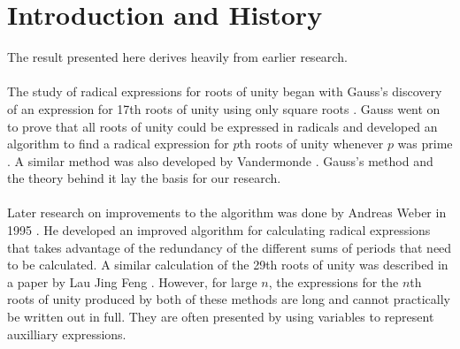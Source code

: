 \documentclass{article}
\begin{document}
\section{Introduction and History}
    The result presented here derives heavily from earlier research.\\
    \\
    The study of radical expressions for roots of unity began with Gauss's discovery of an expression for 17th roots of unity using only square roots \cite{17gon}. Gauss went on to prove that all roots of unity could be expressed in radicals and developed an algorithm to find a radical expression for $ p $th roots of unity whenever $ p $ was prime \cite{rootsunity}. A similar method was also developed by Vandermonde \cite{rootsunity-misc}. Gauss's method and the theory behind it lay the basis for our research.\\
    \\
    Later research on improvements to the algorithm was done by Andreas Weber in 1995 \cite{weber}. He developed an improved algorithm for calculating radical expressions that takes advantage of the redundancy of the different sums of periods that need to be calculated. A similar calculation of the 29th roots of unity was described in a paper by Lau Jing Feng \cite{feng}. However, for large $ n $, the expressions for the $ n $th roots of unity produced by both of these methods are long and cannot practically be written out in full. They are often presented by using variables to represent auxilliary expressions.\\
\end{document}
